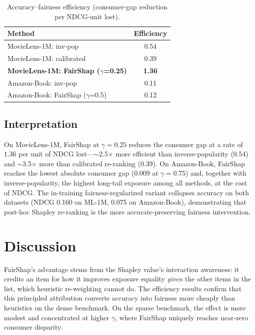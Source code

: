 \documentclass[pdflatex,sn-mathphys-num]{sn-jnl}%
\theoremstyle{thmstyleone}%
\theoremstyle{thmstyletwo}%
\theoremstyle{thmstylethree}%
\begin{document}
\begin{table}[h]
\caption{Accuracy--fairness efficiency (consumer-gap reduction per NDCG-unit lost).}
\label{tab:efficiency}
\centering
\begin{tabular}{lc}
\toprule
Method & Efficiency \\
\midrule
MovieLens-1M: inv-pop & 0.54 \\
MovieLens-1M: calibrated & 0.39 \\
\textbf{MovieLens-1M: FairShap ($\gamma$=0.25)} & \textbf{1.36} \\
Amazon-Book: inv-pop & 0.11 \\
Amazon-Book: FairShap ($\gamma$=0.5) & 0.12 \\
\bottomrule
\end{tabular}
\end{table}

\subsection{Interpretation}
On MovieLens-1M, FairShap at $\gamma=0.25$ reduces the consumer gap at a rate of $1.36$ per unit of NDCG lost---$\sim$2.5$\times$ more efficient than inverse-popularity (0.54) and $\sim$3.5$\times$ more than calibrated re-ranking (0.39). On Amazon-Book, FairShap reaches the lowest absolute consumer gap (0.009 at $\gamma=0.75$) and, together with inverse-popularity, the highest long-tail exposure among all methods, at the cost of NDCG. The in-training fairness-regularized variant collapses accuracy on both datasets (NDCG 0.160 on ML-1M, 0.075 on Amazon-Book), demonstrating that post-hoc Shapley re-ranking is the more accurate-preserving fairness intervention.

\section{Discussion}\label{sec5}

FairShap's advantage stems from the Shapley value's interaction awareness: it credits an item for how it improves exposure equality \emph{given} the other items in the list, which heuristic re-weighting cannot do. The efficiency results confirm that this principled attribution converts accuracy into fairness more cheaply than heuristics on the dense benchmark. On the sparse benchmark, the effect is more modest and concentrated at higher $\gamma$, where FairShap uniquely reaches near-zero consumer disparity.
\end{document}
